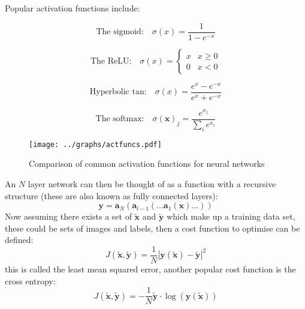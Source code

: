 Popular activation functions include:
\begin{multicols}{2}


\begin{equation}
\text{The sigmoid:}\quad
  \sigma (x) = \frac{1}{1-e^{-x}} \label{eq:sigmoid}
\end{equation}


\begin{equation}
\text{The ReLU:}\quad
\sigma(x) =
\begin{cases}
      x & x\geq 0 \\
      0 & x < 0
   \end{cases}
\end{equation}


\begin{equation}
\text{Hyperbolic tan:}\quad
    \sigma(x)=\frac{e^x - e^{-x}}{e^x + e^{-x}}
\end{equation}


\begin{equation}
\text{The softmax:}\quad
  \sigma(\mathbf{x})_j = \frac{e^{x_j}}{\sum_i e^{x_i}}
\end{equation}


\end{multicols}

\begin{figure} \label{disfagraph}
    \center
  \texttt{[image: ../graphs/actfuncs.pdf]}
  \caption{Comparison of common activation functions for neural networks}
\end{figure}



An $N$ layer network can
then be thought of as a function with a recursive structure (these are also known as fully connected layers):
\begin{equation}
    \mathbf{y} = \mathbf{a}_{N}(\mathbf{a}_{l-1}(...\mathbf{a}_1(\mathbf{x})...))
\end{equation}
Now assuming there exists a set of $\tilde{\mathbf{x}}$ and $\tilde{\mathbf{y}}$ which make
up a training data set, these could be sets of images and labels, then a cost function
to optimise can be defined:
\begin{equation}
    J(\tilde{\mathbf{x}},\tilde{\mathbf{y}}) = \frac{1}{N}\left |\mathbf{y}(\tilde{\mathbf{x}})-\tilde{\mathbf{y}}\right | ^2
\end{equation}
this is called the least mean squared error, another popular cost function is
the cross entropy:
\begin{equation}
    J(\tilde{\mathbf{x}},\tilde{\mathbf{y}}) = -\frac{1}{N}\tilde{\mathbf{y}}\cdot\log(\mathbf{y}(\tilde{\mathbf{x}}))
\end{equation}

